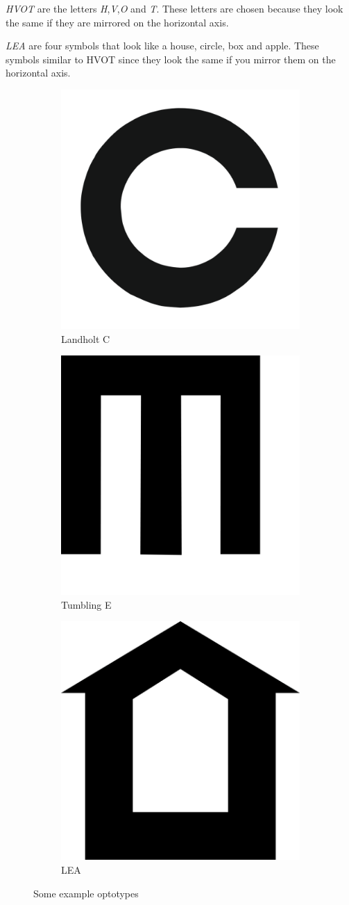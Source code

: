 \documentclass[12pt,a4paper,notitlepage]{report}
\begin{document}
\textit{HVOT} are the letters \textit{H},\textit{V},\textit{O} and \textit{T}. These letters are chosen because they look the same if they are mirrored on the horizontal axis.

\textit{LEA} are four symbols that look like a house, circle, box and apple. These symbols similar to HVOT since they look the same if you mirror them on the horizontal axis.

\begin{figure}[ht!]
\centering
\begin{subfigure}{.3\textwidth}
  \centering
  \includegraphics[width=.4\linewidth]{images/landholt_c_optotype.png}
  \caption{Landholt C}
  \label{fig:landholt_c}
\end{subfigure}%
\begin{subfigure}{.3\textwidth}
  \centering
  \includegraphics[width=.4\linewidth]{images/tumbling_e_optotype.png}
  \caption{Tumbling E}
  \label{fig:tumbling_e}
\end{subfigure}
\begin{subfigure}{.3\textwidth}
  \centering
  \includegraphics[width=.4\linewidth]{images/lea_optotype.png}
  \caption{LEA}
  \label{fig:lea}
\end{subfigure}
\caption{Some example optotypes}
\label{fig:optotypes_example}
\end{figure}
\end{document}
